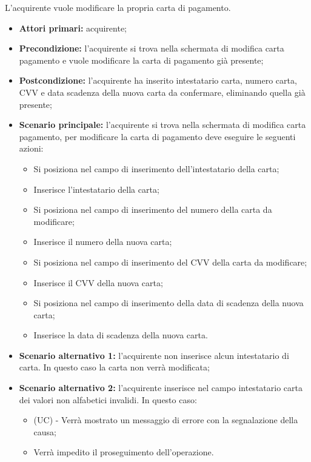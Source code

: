L'acquirente vuole modificare la propria carta di pagamento.
\begin{itemize}
    \item \textbf{Attori primari:} acquirente;
    \item \textbf{Precondizione:} l'acquirente si trova nella schermata di modifica carta pagamento e vuole modificare la carta di pagamento già presente;
    \item \textbf{Postcondizione:} l'acquirente ha inserito intestatario carta, numero carta, CVV e data scadenza della nuova carta da confermare, eliminando quella già presente;
    \item \textbf{Scenario principale:} l'acquirente si trova nella schermata di modifica carta pagamento, per modificare la carta di pagamento deve eseguire le seguenti azioni:
        \begin{itemize}
            \item Si posiziona nel campo di inserimento dell'intestatario della carta;
            \item Inserisce l'intestatario della carta;
            \item Si posiziona nel campo di inserimento del numero della carta da modificare;
            \item Inserisce il numero della nuova carta;
            \item Si posiziona nel campo di inserimento del CVV della carta da modificare;
            \item Inserisce il CVV della nuova carta;
            \item Si posiziona nel campo di inserimento della data di scadenza della nuova carta;
            \item Inserisce la data di scadenza della nuova carta.
        \end{itemize}
    \item \textbf{Scenario alternativo 1:} l'acquirente non inserisce alcun intestatario di carta. In questo caso la carta non verrà modificata;
    \item \textbf{Scenario alternativo 2:} l'acquirente inserisce nel campo intestatario carta dei valori non alfabetici invalidi. In questo caso:
    \begin{itemize}
        \item (UC) - Verrà mostrato un messaggio di errore con la segnalazione della causa;
        \item Verrà impedito il proseguimento dell'operazione.
    \end{itemize}    

\end{itemize}
